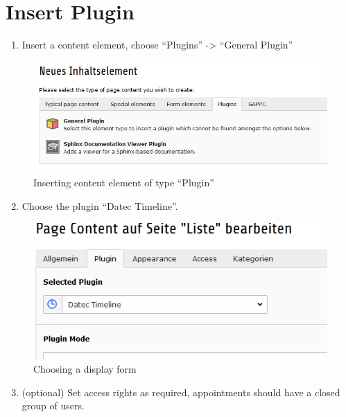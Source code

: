 \documentclass[a4paper,10pt,english]{sphinxmanual}
\begin{document}
\section{Insert Plugin}
\label{AdministratorManual/Index:insert-plugin}\begin{enumerate}
\item {} 
Insert a content element, choose ``Plugins'' -\textgreater{} ``General Plugin''

\end{enumerate}
\begin{figure}[htbp]
\centering
\capstart

\includegraphics{plugin_01.png}
\caption{Inserting content element of type ``Plugin''}\end{figure}
\begin{enumerate}
\setcounter{enumi}{1}
\item {} 
Choose the plugin ``Datec Timeline''.

\end{enumerate}
\begin{figure}[htbp]
\centering
\capstart

\includegraphics{plugin_02.png}
\caption{Choosing a display form}\end{figure}
\begin{enumerate}
\setcounter{enumi}{2}
\item {} 
(optional) Set access rights as required, appointments should have a closed group of users.

\end{enumerate}
\end{document}
